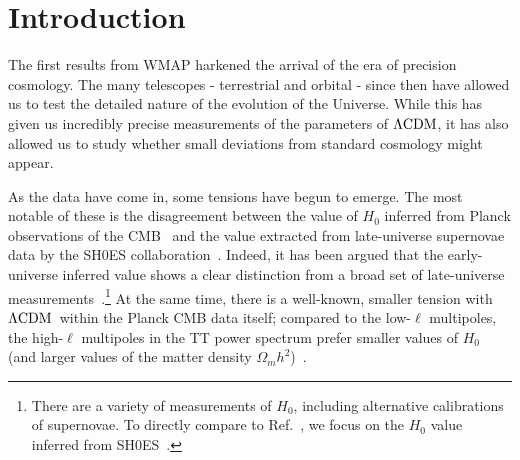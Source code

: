 \documentclass[aps,prd,twocolumn,nofootinbib,superscriptaddress]{revtex4}
\def\lcdm{$\Lambda{\rm CDM}$}
\begin{document}
\maketitle

\section{Introduction}
The first results from WMAP harkened the arrival of the era of precision cosmology. The many telescopes - terrestrial and orbital - since then have allowed us to test the detailed nature of the evolution of the Universe. While this has given us incredibly precise measurements of the parameters of \lcdm, it has also allowed us to study whether small deviations from standard cosmology might appear.

As the data have come in, some tensions have begun to emerge. The most notable of these is the disagreement between the value of $H_0$ inferred from Planck observations of the CMB~\cite{Planck:2018vyg} and the value extracted from late-universe supernovae data by the SH0ES collaboration~\cite{Riess:2020fzl}. Indeed, it has been argued that the early-universe inferred value shows a clear distinction from a broad set of late-universe measurements~\cite{Riess:2020fzl,Freedman:2019jwv,Freedman:2021ahq,Yuan:2019npk,Soltis:2020gpl,Wong:2019kwg,Pesce:2020xfe,LIGOScientific:2019zcs}.\footnote{There are a variety of measurements of $H_0$, including alternative calibrations of supernovae. To directly compare to Ref.~\cite{Schoneberg:2021qvd}, we focus on the $H_0$ value inferred from SH0ES~\cite{Riess:2020fzl}.} At the same time, there is a well-known, smaller tension with \lcdm\ within the Planck CMB data itself; compared to the low-$\ell$ multipoles, the high-$\ell$ multipoles in the TT power spectrum prefer smaller values of $H_0$ (and larger values of the matter density $\Omega_m h^2$)~\cite{Addison:2015wyg,Planck:2018vyg}. 
\end{document}
